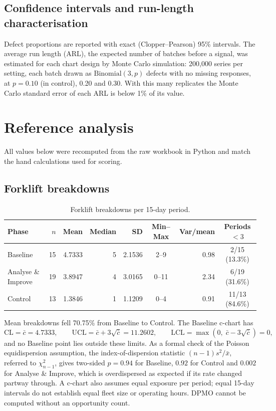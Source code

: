 \documentclass[11pt]{article}
\begin{document}
\subsection{Confidence intervals and run-length characterisation}
Defect proportions are reported with exact (Clopper--Pearson) 95\% intervals. The average run length (ARL), the expected number of batches before a signal, was estimated for each chart design by Monte Carlo simulation: 200{,}000 series per setting, each batch drawn as $\mathrm{Binomial}(3,p)$ defects with no missing responses, at $p=0.10$ (in control), 0.20 and 0.30. With this many replicates the Monte Carlo standard error of each ARL is below 1\% of its value.

\section{Reference analysis}\label{sec:reference}
All values below were recomputed from the raw workbook in Python and match the hand calculations used for scoring.

\subsection{Forklift breakdowns}
\begin{table}[!htbp]
\centering\small
\caption{Forklift breakdowns per 15-day period.}
\begin{tabular}{@{}lrrrrcrc@{}}
\toprule
Phase & $n$ & Mean & Median & SD & Min--Max & Var/mean & Periods $<3$ \\
\midrule
Baseline & 15 & 4.7333 & 5 & 2.1536 & 2--9 & 0.98 & 2/15 (13.3\%) \\
Analyse \& Improve & 19 & 3.8947 & 4 & 3.0165 & 0--11 & 2.34 & 6/19 (31.6\%) \\
Control & 13 & 1.3846 & 1 & 1.1209 & 0--4 & 0.91 & 11/13 (84.6\%) \\
\bottomrule
\end{tabular}
\end{table}
Mean breakdowns fell 70.75\% from Baseline to Control. The Baseline c-chart has
\begin{equation}
\mathrm{CL}=\bar c=4.7333,\qquad \mathrm{UCL}=\bar c+3\sqrt{\bar c}=11.2602,\qquad \mathrm{LCL}=\max\!\left(0,\;\bar c-3\sqrt{\bar c}\right)=0,
\end{equation}
and no Baseline point lies outside these limits. As a formal check of the Poisson equidispersion assumption, the index-of-dispersion statistic $(n-1)s^2/\bar x$, referred to $\chi^2_{n-1}$, gives two-sided $p=0.94$ for Baseline, $0.92$ for Control and $0.002$ for Analyse \& Improve, which is overdispersed as expected if its rate changed partway through. A c-chart also assumes equal exposure per period; equal 15-day intervals do not establish equal fleet size or operating hours. DPMO cannot be computed without an opportunity count.
\end{document}
